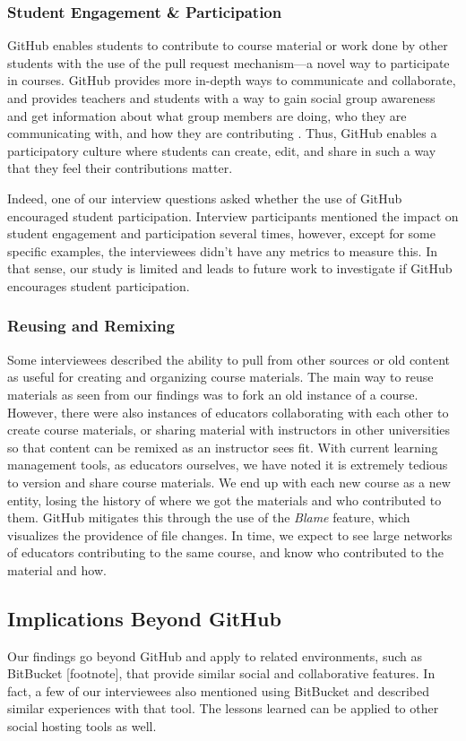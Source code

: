 \subsubsection{Student Engagement \& Participation}
GitHub enables students to contribute to course material or work done by other students with the use of the pull request mechanism---a novel way to participate in courses. GitHub provides more in-depth ways to communicate and collaborate, and provides teachers and students with a way to gain social group awareness and get information about what group members are doing, who they are communicating with, and how they are contributing \cite{janssen2013coordinated}. Thus, GitHub enables a participatory culture \cite{jenkins2009confronting} where students can create, edit, and share in such a way that they feel their contributions matter.

Indeed, one of our interview questions asked whether the use of GitHub encouraged student participation. Interview participants mentioned the impact on student engagement and participation several times, however, except for some specific examples, the interviewees didn't have any metrics to measure this. In that sense, our study is limited and leads to future work to investigate if GitHub encourages student participation.

\subsubsection{Reusing and Remixing}
Some interviewees described the ability to pull from other sources or old content as useful for creating and organizing course materials. The main way to reuse materials as seen from our findings was to fork an old instance of a course. However, there were also instances of educators collaborating with each other to create course materials, or sharing material with instructors in other universities so that content can be remixed as an instructor sees fit. With current learning management tools, as educators ourselves, we have noted it is extremely tedious to version and share course materials. We end up with each new course as a new entity, losing the history of where we got the materials and who contributed to them. GitHub mitigates this through the use of the \textit{Blame} feature, which visualizes the providence of file changes. In time, we expect to see large networks of educators contributing to the same course, and know who contributed to the material and how.

\subsection{Implications Beyond GitHub}
Our findings go beyond GitHub and apply to related environments, such as BitBucket [footnote], that provide similar social and collaborative features. In fact, a few of our interviewees also mentioned using BitBucket and described similar experiences with that tool. The lessons learned can be applied to other social hosting tools as well.

